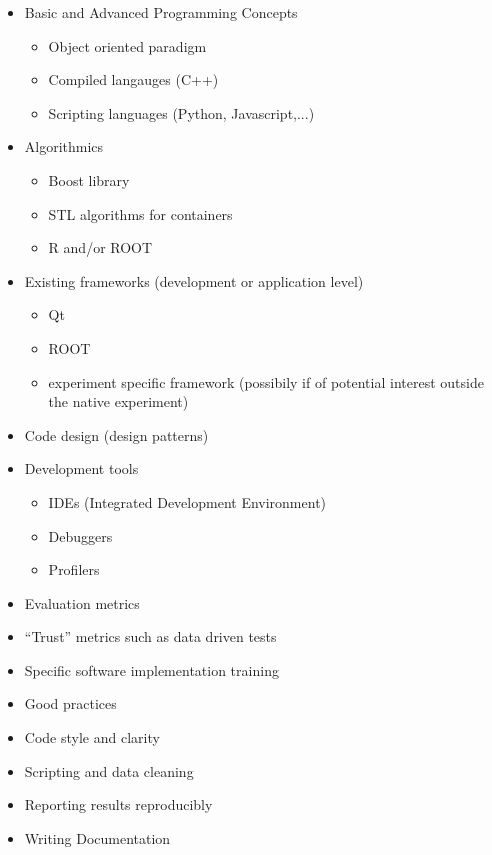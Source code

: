 \begin{itemize}[itemsep=0pt,parsep=0pt,topsep=5pt,partopsep=0pt]
   \item Basic and Advanced Programming Concepts
   \begin{itemize}[itemsep=0pt,parsep=0pt,topsep=5pt,partopsep=0pt]
      \item Object oriented paradigm
      \item Compiled langauges (C++)
      \item Scripting languages (Python, Javascript,...)
   \end{itemize}
   \item Algorithmics 
   \begin{itemize}[itemsep=0pt,parsep=0pt,topsep=5pt,partopsep=0pt]
      \item Boost library
      \item STL algorithms for containers
      \item R and/or ROOT
   \end{itemize}
   \item Existing frameworks (development or application level)
   \begin{itemize}[itemsep=0pt,parsep=0pt,topsep=5pt,partopsep=0pt]
      \item Qt
      \item ROOT
      \item experiment specific framework (possibily if of potential interest outside the native experiment)
   \end{itemize}
   \item Code design (design patterns)
   \item Development tools
   \begin{itemize}[itemsep=0pt,parsep=0pt,topsep=5pt,partopsep=0pt]
      \item IDEs (Integrated Development Environment)
      \item Debuggers
      \item Profilers
   \end{itemize}
   \item Evaluation metrics
   \item “Trust” metrics such as data driven tests
   \item Specific software implementation training
   \item Good practices 
   \item Code style and clarity
   \item Scripting and data cleaning
   \item Reporting results reproducibly
   \item Writing Documentation
\end{itemize}


